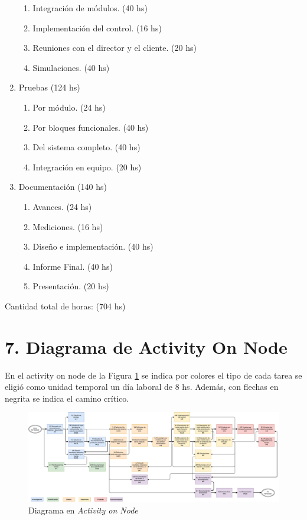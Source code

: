 \documentclass[11pt]{charter}
\begin{document}
\begin{enumerate}
\begin{enumerate}
	\item Integración de módulos. (40 hs)
	\item Implementación del control. (16 hs)
	\item Reuniones con el director y el cliente. (20 hs)
	\item Simulaciones. (40 hs)
	\end{enumerate}
\item Pruebas (124 hs)
	\begin{enumerate}
	\item Por módulo. (24 hs)
	\item Por bloques funcionales. (40 hs)
	\item Del sistema completo. (40 hs)
	\item Integración en equipo. (20 hs)
	\end{enumerate}
\item Documentación (140 hs)
	\begin{enumerate}
	\item Avances. (24 hs)
	\item Mediciones. (16 hs)
	\item Diseño e implementación. (40 hs)
	\item Informe Final. (40 hs)
	\item Presentación. (20 hs)
	\end{enumerate}
\end{enumerate}

Cantidad total de horas: (704 hs)

\section{7. Diagrama de Activity On Node}
\label{sec:AoN}




En el activity on node de la Figura \ref{fig:AoN} se indica por colores el tipo de cada tarea se eligió como unidad temporal un día laboral de 8 hs. Además, con flechas en negrita se indica el camino crítico.

\begin{figure}[htpb]
\centering 
\includegraphics[width=1.5\textwidth, angle =270]{./Figuras/AoN.pdf}
\caption{Diagrama en \textit{Activity on Node}}
\label{fig:AoN}
\end{figure}
\end{document}
